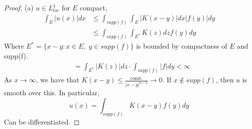 \documentclass{article}
\newtheorem{one minute paper}[theorem]{One Minute Paper}
\begin{document}
\begin{proof}
    (a) $u \in L^1_{loc}$ for $E$ compact, 
    \begin{align*}
        \int_{E}|u(x)| dx &\leq \int_{supp(f)}\int_E|K(x-y)|dx |f(y)|dy \\
        &\leq \int_{supp(f)}\int_{E^{*}}K(z)dzf(y)dy
    \end{align*}
    Where $E^{*} = \{x- y : x \in E, \; y \in supp(f)\}$ is bounded by compactness of $E$ and supp(f). 
    \begin{align*}
        &= \int_{E^{*}}|K(z)|dz  \cdot \int_{supp(f)}|f|dy < \infty
    \end{align*}
    As $x \rightarrow \infty$, we have that $K(x-y) \leq \frac{\text{const.}}{|x-y|^{n-2}} \rightarrow 0$. If $x \notin supp(f)$, then $u$ is smooth over this. In particular, 
    \begin{equation}
        u(x) = \int_{supp(f)}K(x-y)f(y)dy
    \end{equation}
    Can be differentiated. 
\end{proof} 
\end{document}

